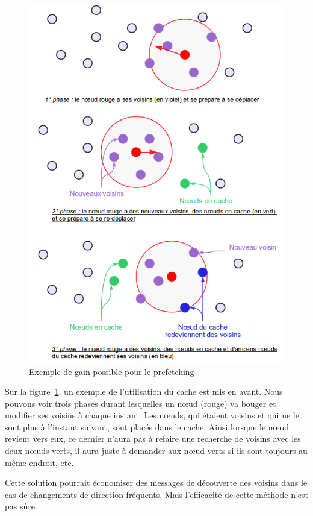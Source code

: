 \documentclass[11pt,a4paper]{article}
\begin{document}
	\begin{figure}[!h]
        \centering
        \includegraphics[scale=0.40]{./images/cacheW.png}
        \caption{Exemple de gain possible pour le prefetching}
        \label{cacheW}
        \end{figure} 

\par Sur la figure~\ref{cacheW}, un exemple de l'utilisation du cache est mis en avant. Nous pouvons voir trois phases durant lesquelles un nœud (rouge) va bouger et modifier ses voisins à chaque instant. Les nœuds, qui étaient voisins et qui ne le sont plus à l'instant suivant, sont placés dans le cache. Ainsi lorsque le nœud revient vers eux, ce dernier n'aura pas à refaire une recherche de voisins avec les deux nœuds verts, il aura juste à demander aux nœud verts si ils sont toujours au même endroit, etc.
\par Cette solution pourrait économiser des messages de découverte des voisins dans le cas de changements de direction fréquents. Mais l'efficacité de cette méthode n'est pas sûre. 
 
\end{document}

